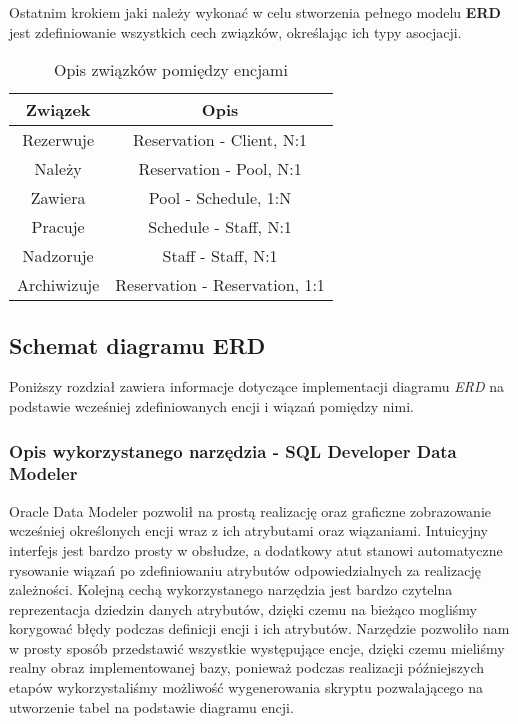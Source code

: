 \documentclass[a4paper]{article}
\begin{document}
Ostatnim krokiem jaki należy wykonać w celu stworzenia pełnego modelu \textbf{ERD} jest zdefiniowanie wszystkich cech związków, określając ich typy asocjacji.

\begin{table}[h!]
\centering
\begin{tabular}{|c|c|}
\hline
\textbf{Związek} & \textbf{Opis}             \\ \hline
Rezerwuje        & Reservation - Client, N:1 \\ \hline
Należy           & Reservation - Pool, N:1   \\ \hline
Zawiera          & Pool - Schedule, 1:N         \\ \hline
Pracuje          & Schedule - Staff, N:1     \\ \hline
Nadzoruje        & Staff - Staff, N:1        \\ \hline
Archiwizuje      & Reservation - Reservation, 1:1 \\ \hline
\end{tabular}
\caption{Opis związków pomiędzy encjami}
\end{table}

\newpage

\subsection{Schemat diagramu \textbf{ERD}}

Poniższy rozdział zawiera informacje dotyczące implementacji diagramu \textit{ERD} na podstawie wcześniej zdefiniowanych encji i wiązań pomiędzy nimi.

\subsubsection{Opis wykorzystanego narzędzia - SQL Developer Data Modeler}

Oracle Data Modeler pozwolił na prostą realizację oraz graficzne zobrazowanie wcześniej określonych encji wraz z ich atrybutami oraz wiązaniami. Intuicyjny interfejs jest bardzo prosty w obsłudze, a dodatkowy atut stanowi automatyczne rysowanie wiązań po zdefiniowaniu atrybutów odpowiedzialnych za realizację zależności. Kolejną cechą wykorzystanego narzędzia jest bardzo czytelna reprezentacja dziedzin danych atrybutów, dzięki czemu na bieżąco mogliśmy korygować błędy podczas definicji encji i ich atrybutów. Narzędzie pozwoliło nam w prosty sposób przedstawić wszystkie występujące encje, dzięki czemu mieliśmy realny obraz implementowanej bazy, ponieważ podczas realizacji późniejszych etapów wykorzystaliśmy możliwość wygenerowania skryptu pozwalającego na utworzenie tabel na podstawie diagramu encji.
\end{document}
